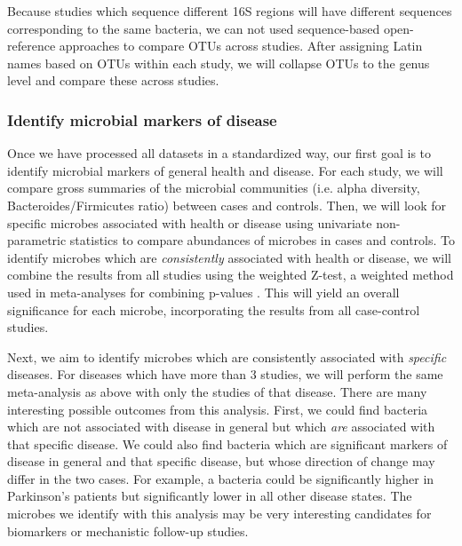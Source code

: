 \documentclass[12pt]{article}
\begin{document}
Because studies which sequence different 16S regions will have 
different sequences corresponding to the same bacteria, we can not 
used sequence-based open-reference approaches to compare OTUs across 
studies. After assigning Latin names based on OTUs within each study, 
we will collapse OTUs to the genus level and compare these across 
studies.

\subsubsection{Identify microbial markers of disease}\label{sec:indep_studies}
Once we have processed all datasets in a standardized way, our first 
goal is to identify microbial markers of general health and disease. 
For each study, we will compare gross summaries of the microbial communities
(i.e. alpha diversity, Bacteroides/Firmicutes ratio) between cases and controls.
Then, we will look for specific microbes associated with health or disease using
univariate non-parametric statistics to compare abundances of microbes in cases
and controls. To identify microbes which are \textit{consistently} associated with
health or disease, we will combine the results from all studies using 
the weighted Z-test, a weighted method used in meta-analyses for combining p-values \cite{zavkin-ztest-2011}. 
This will yield an overall significance for each microbe,
incorporating the results from all case-control studies.

Next, we aim to identify microbes which are consistently associated with \textit{specific}
diseases. For diseases which have more than 3 studies, we will
perform the same meta-analysis as above with only the studies
of that disease. There are many interesting possible outcomes from this analysis.
First, we could find bacteria which are not associated with disease in general 
but which \textit{are} associated with that specific disease. 
We could also find bacteria which are significant markers of disease in general and 
that specific disease, but whose direction of change may differ in the two cases.
For example, a bacteria could be significantly higher in Parkinson's patients but
significantly lower in all other disease states. The microbes we identify with this
analysis may be very interesting candidates for biomarkers or mechanistic follow-up studies.
\end{document}
